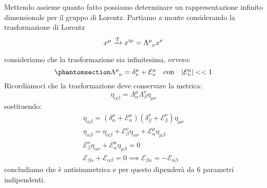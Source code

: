 Mettendo assieme quanto fatto possiamo determinare un rappresentazione infinito dimensionale per il gruppo di Lorentz.
Partiamo a monte considerando la trasformazione di Lorentz 
\begin{equation}
  x^{\mu}\xrightarrow[\text{}]{\text{T}}x'^{\mu}=\Lambda\indices{^\mu_\nu} x^{\nu}
\end{equation}
consideriamo che la trasformazione sia infinitesima, ovvero:
\begin{equation}\phantomsection\label{eq:tras_inf}
  \Lambda\indices{^\mu_\nu}=\delta{^\mu_\nu}+\mathcal{E}{^\mu_\nu} \quad\text{con} \quad |\mathcal{E}{^\mu_\nu}|<<1
\end{equation}
Ricordiamoci che la trasformazione deve conservare la metrica:
\begin{equation}
\eta_{\alpha\beta}=\Lambda^\mu_\alpha\Lambda^\nu_\beta\eta_{\mu\nu}
\end{equation}
sostituendo:
\begin{equation}
\begin{gathered}
\eta_{\alpha\beta}=(\delta^\mu_\alpha+\mathcal{E}^\mu_\alpha)(\delta^\nu_\beta+\mathcal{E}^\nu_\beta)\eta_{\mu\nu}
\\
\eta_{\alpha\beta}=\eta_{\alpha\beta}+\mathcal{E}^\nu_\beta\eta_{\alpha\nu}+\mathcal{E}^\mu_\alpha\eta_{\mu\beta}
\\
\mathcal{E}^\nu_\beta\eta_{\alpha\nu}+\mathcal{E}^\mu_\alpha\eta_{\mu\beta}=0\\
\mathcal{E}_{\beta\alpha}+\mathcal{E}_{\alpha\beta}=0 \implies \mathcal{E}_{\beta\alpha}=-\mathcal{E}_{\alpha\beta}
\end{gathered}
\end{equation}
concludiamo che è antisimmetrica e per questo dipenderà da 6 parametri indipendenti.


